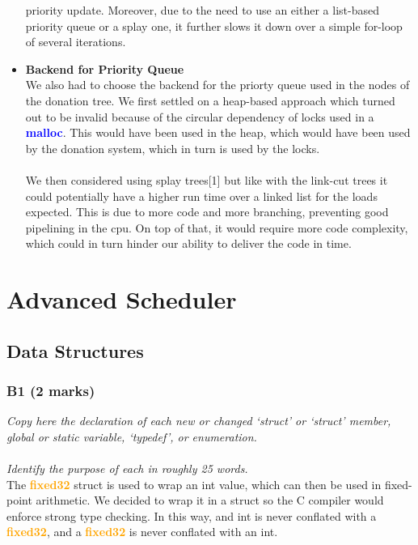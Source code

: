 \documentclass{report}
\newcommand{\question}[1]{\textit{#1} \\ }
\newcommand{\bullpara}[2]{\item \textbf{#1} \ #2}
\newcommand{\fun}[1]{\textcolor{blue}{\textbf{#1}}}
\newcommand{\file}[1]{\textcolor{green}{\textbf{#1}}}
\newcommand{\struct}[1]{\textcolor{orange}{\textbf{#1}}}
\newcommand{\pintoscode}[4]{}
\begin{document}
\begin{itemize}
{                            priority update. Moreover, due to the need to use an either a list-based priority queue or a splay one, it further slows it down over
                            a simple for-loop of several iterations.
                        }
                        \bullpara{Backend for Priority Queue}{
                            \\ We also had to choose the backend for the priorty queue used in the nodes of the donation tree. We first settled on a heap-based approach
                            which turned out to be invalid because of the circular dependency of locks used in a \fun{malloc}. This would have been used in the heap,
                            which would have been used by the donation system, which in turn is used by the locks. 
                            \\ \\ We then considered using splay trees[1] but
                            like with the link-cut trees it could potentially have a higher run time over a linked list for the loads expected. This is due to more code and more branching,
                            preventing good pipelining in the cpu. On top of that, it would require more code complexity, which could in turn hinder our ability to deliver the code
                            in time.
                        }
                    \end{itemize}

    \section*{Advanced Scheduler}

        \subsection*{Data Structures}
            \subsubsection*{B1  (2 marks)}
                \question{Copy here the declaration of each new or changed `struct' or `struct' member, global or static variable, `typedef', or enumeration. 
                \\
                \\ Identify the purpose of each in roughly 25 words.}
                \pintoscode{17}{19}{fixed-point.h}{../lib/kernel/fixed-point.h}
                The \struct{fixed32} struct is used to wrap an int value, which can then be used in fixed-point arithmetic. We decided to wrap it in a struct so the C compiler would enforce strong type checking. In this way, and int is never conflated with a \struct{fixed32}, and a \struct{fixed32} is never conflated with an int.
                
\end{document}
